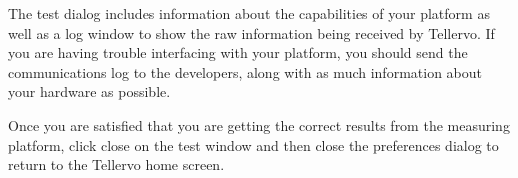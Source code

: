 The test dialog includes information about the capabilities of your platform as well as a log window to show the raw information being received by Tellervo.  If you are having trouble interfacing with your platform, you should send the communications log to the developers, along with as much information about your hardware as possible.

Once you are satisfied that you are getting the correct results from the measuring platform, click close on the test window and then close the preferences dialog to return to the Tellervo home screen.





